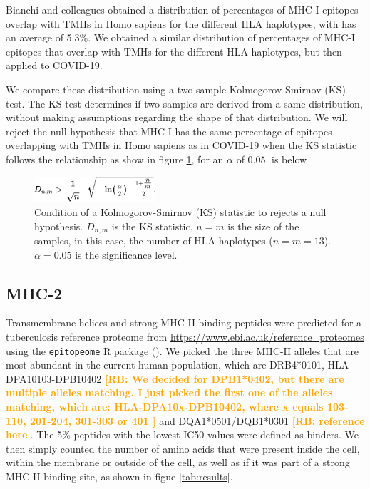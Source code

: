 \documentclass{article}
\newcommand{\richel}[1]{\textcolor{orange}{\textbf{[RB: #1]}}}
\begin{document}
Bianchi and colleagues obtained a distribution of 
percentages of MHC-I epitopes overlap with TMHs in Homo sapiens
for the different HLA haplotypes, with has an average of 5.3\%.
We obtained a similar distribution of percentages of MHC-I epitopes that 
overlap with TMHs for the different HLA haplotypes, but then applied to
COVID-19.

We compare these distribution using a two-sample 
Kolmogorov-Smirnov (KS) test. The KS test determines if two samples
are derived from a same distribution, without making assumptions
regarding the shape of that distribution. We will reject
the null hypothesis that MHC-I has the same percentage of epitopes 
overlapping with TMHs in Homo sapiens as in COVID-19 when 
the KS statistic follows the relationship as show in 
figure \ref{fig:ks}, for an $\alpha$ of $0.05$.
is below 

\begin{figure}[!htbp]
  \includegraphics[width=0.4\textwidth]{pics/ks.png}
  \caption{
    Condition of a Kolmogorov-Smirnov (KS) statistic to rejects a null
    hypothesis. $D_{n,m}$ is the KS statistic, $n = m$ is the size
    of the samples, in this case, the number of HLA haplotypes ($n = m = 13$).
    $\alpha = 0.05$ is the significance level.
  }
  \label{fig:ks}
\end{figure}

\subsection{MHC-2}

Transmembrane helices and strong MHC-II-binding peptides
were predicted for a tuberculosis reference proteome 
from \url{https://www.ebi.ac.uk/reference_proteomes}
using the \verb;epitopeome; R package (\cite{epitopeome}).
We picked the three MHC-II alleles that are most abundant 
in the current human population, 
which are DRB4*0101, HLA-DPA10103-DPB10402 
\richel{
  We decided for DPB1*0402, but there are multiple alleles matching.
  I just picked the first one of the alleles matching, which are:
  HLA-DPA10x-DPB10402, where x equals 103-110, 201-204, 301-303 or 401
}
and DQA1*0501/DQB1*0301 \richel{reference here}.
The 5\% peptides with the lowest IC50 values were defined as binders.
We then simply counted the number of amino acids that were present inside the
cell, within the membrane or outside of the cell, as well as if it was part 
of a strong MHC-II binding site, as shown in figue \ref{tab:results}.
\end{document}
